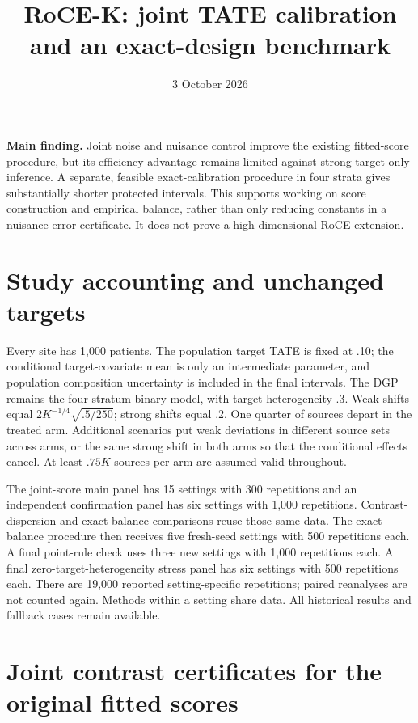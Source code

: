 \documentclass[11pt]{article}
\title{RoCE-K: joint TATE calibration and an exact-design benchmark}
\author{}\date{3 October 2026}
\begin{document}
\maketitle

\textbf{Main finding.} Joint noise and nuisance control improve the existing
fitted-score procedure, but its efficiency advantage remains limited against
strong target-only inference. A separate, feasible exact-calibration procedure
in four strata gives substantially shorter protected intervals. This supports
working on score construction and empirical balance, rather than only reducing
constants in a nuisance-error certificate. It does not prove a high-dimensional
RoCE extension.

\section{Study accounting and unchanged targets}

Every site has 1,000 patients. The population target TATE is fixed at .10;
the conditional target-covariate mean is only an intermediate parameter,
and population composition uncertainty is included in the final intervals.
The DGP remains the four-stratum binary model, with target heterogeneity .3.
Weak shifts equal $2K^{-1/4}\sqrt{.5/250}$; strong shifts equal .2.
One quarter of sources depart in the treated arm. Additional scenarios put
weak deviations in different source sets across arms, or the same strong
shift in both arms so that the conditional effects cancel.
At least $.75K$ sources per arm are assumed valid throughout.

The joint-score main panel has 15 settings with 300 repetitions and an
independent confirmation panel has six settings with 1,000 repetitions.
Contrast-dispersion and exact-balance comparisons reuse those same data.
The exact-balance procedure then receives five fresh-seed settings with 500
repetitions each. A final point-rule check uses three new settings with
1,000 repetitions each. A final zero-target-heterogeneity stress panel has six settings with 500
repetitions each. There are 19,000 reported setting-specific repetitions;
paired reanalyses are not counted again. Methods within a setting share data.
All historical results and fallback cases remain available.

\section{Joint contrast certificates for the original fitted scores}
\end{document}
